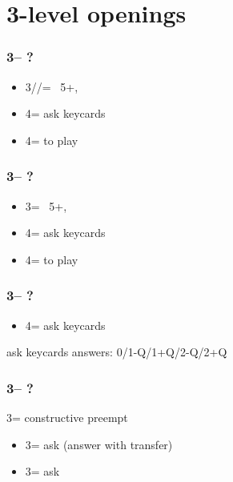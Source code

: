 \documentclass[12pt, a4paper]{report}
\begin{document}
{{{        }

        \section*{\colorbox{blue!30}{3-level openings}}
         {
        
            \subsubsection*{3\clubs -- ?}
            \begin{itemize}
                \item 3\diams/\hearts/\spades = \nat\ 5+, \gf
                \item 4\diams = ask keycards
                \item 4\major = to play
            \end{itemize}

            \subsubsection*{3\diams -- ?}
            \begin{itemize}
                \item 3\major = \nat\ 5+, \gf
                \item 4\clubs = ask keycards
                \item 4\major = to play
            \end{itemize}

            \subsubsection*{3\major -- ?}
            \begin{itemize}
                \item 4\clubs = ask keycards
            \end{itemize}

            \vspace{0.5cm}
            ask keycards answers: 0/1-Q/1+Q/2-Q/2+Q
            \vspace{0.4cm}

            \subsubsection*{3\nt -- ?}
            3\nt = constructive \major preempt
            \begin{itemize}
                \item 3\clubs = ask (answer with transfer)
                \item 3\diams = ask
            \end{itemize}
        }

    }

}
\end{document}
